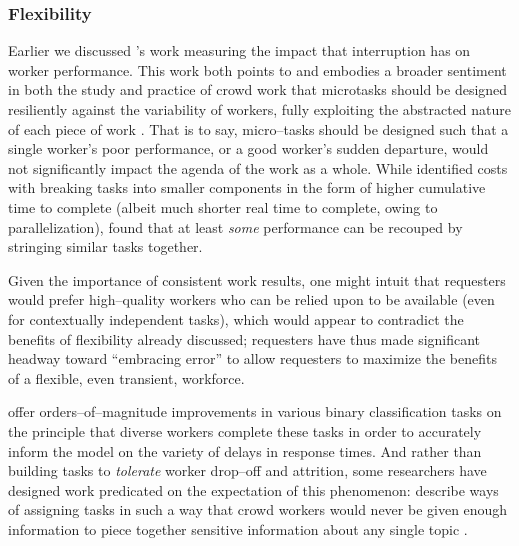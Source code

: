 \documentclass{sigchi}
\newcommand{\msb}[1]{{\color{PineGreen}[MSB: #1]}}
\begin{document}
\subsubsection{Flexibility}\label{sec:flexibility}

Earlier we discussed \citeauthor{cheng2015break}'s work
measuring the impact that interruption has on worker performance.
This work both points to and embodies a broader sentiment in
both the study and practice
of crowd work that microtasks should be designed resiliently against the variability of workers,
fully exploiting the abstracted nature of each piece of work
\cite{interruptionIqbal,delayAndOrderLasecki,vaish2014low}.
That is to say, micro--tasks should be designed such that a single worker's poor performance,
or a good worker's sudden departure,
would not significantly impact the agenda of the work as a whole.
While \citeauthor{cheng2015break} identified costs with breaking tasks into smaller components
in the form of higher cumulative time to complete
(albeit much shorter real time to complete, owing to parallelization),
\citeauthor{delayAndOrderLasecki} found that at least \textit{some} performance can be recouped by stringing 
similar tasks together.


Given the importance of consistent work results, one might intuit that
requesters would prefer high--quality workers who can be relied upon to be available
(even for contextually independent tasks),
which would appear to contradict the benefits of flexibility already discussed;
requesters have thus made significant headway toward
``embracing error'' to allow requesters to maximize the benefits of a flexible,
even transient,
workforce.

\citeauthor{embracingErrorKrishna} offer orders--of--magnitude improvements
in various binary classification tasks
on the principle that diverse workers complete these tasks
in order to accurately inform the model on the variety of delays in response times.
And rather than building tasks to \textit{tolerate} worker drop--off and attrition,
some researchers have designed work predicated on the expectation of this phenomenon:
\citeauthor{sensitiveTasks} describe ways of assigning tasks in such a way that
crowd workers would never be given enough information to piece together sensitive information about
any single topic
\cite{sensitiveTasks}.
\end{document}
